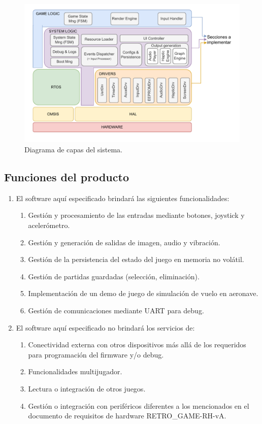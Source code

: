 \documentclass[11pt,a4paper]{article}
\begin{document}
\begin{figure}[htpb]
\centering 
\includegraphics[width=.85\textwidth]{../Figuras/SW_layers.pdf}
\caption{Diagrama de capas del sistema.}
\label{fig:diagCapas}
\end{figure}


\subsection{Funciones del producto}
\label{sec:orgaf51da6}

\begin{enumerate}
  \item El software aquí especificado brindará las siguientes funcionalidades:
  \begin{enumerate}
    \item Gestión y procesamiento de las entradas mediante botones, joystick y acelerómetro.
    \item Gestión y generación de salidas de imagen, audio y vibración.
    \item Gestión de la persistencia del estado del juego en memoria no volátil.
    \item Gestión de partidas guardadas (selección, eliminación).
    \item Implementación de un demo de juego de simulación de vuelo en aeronave.
    \item Gestión de comunicaciones mediante UART para debug.
  \end{enumerate}
  \item El software aquí especificado no brindará los servicios de:
  \begin{enumerate}
    \item Conectividad externa con otros dispositivos más allá de los requeridos para programación del firmware y/o debug.
    \item Funcionalidades multijugador.
    \item Lectura o integración de otros juegos.
    \item Gestión o integración con periféricos diferentes a los mencionados en el documento de requisitos de hardware RETRO\_GAME-RH-vA.
  \end{enumerate}
\end{enumerate}
\end{document}
